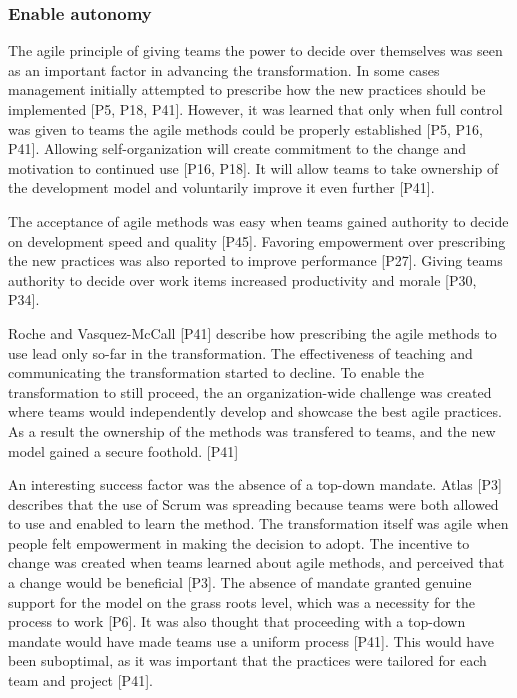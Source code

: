 \documentclass[preprint,authoryear,12pt]{elsarticle}
\begin{document}
\subsubsection{Enable autonomy}


The agile principle of giving teams the power to decide over themselves was seen
as an important factor in advancing the transformation.
In some cases management initially attempted to prescribe how the new practices
should be implemented [P5, P18, P41]. However, it was learned that only when
full control was given to teams the agile methods could be properly established
[P5, P16, P41].
Allowing self-organization will create commitment to the change and motivation
to continued use [P16, P18]. It will allow teams to take ownership of the
development model and voluntarily improve it even further [P41].

The acceptance of agile methods was easy when teams gained authority to decide
on development speed and quality [P45]. Favoring empowerment over prescribing
the new practices was also reported to improve performance [P27]. Giving teams
authority to decide over work items increased productivity and morale [P30,
P34].

Roche and Vasquez-McCall [P41] describe how prescribing the agile methods to use
lead only so-far in the transformation. The effectiveness of teaching and
communicating the transformation started to decline. To enable the
transformation to still proceed, the an organization-wide challenge was created
where teams would independently develop and showcase the best agile practices.
As a result the ownership of the methods was transfered to teams, and the new
model gained a secure foothold. [P41]


An interesting success factor was the absence of a top-down mandate. Atlas [P3]
describes that the use of Scrum was spreading because teams were both allowed to
use and enabled to learn the method. The transformation itself was agile when
people felt empowerment in making the decision to adopt. The incentive to change
was created when teams learned about agile methods, and perceived that a change
would be beneficial [P3].
The absence of mandate granted genuine support for the model on the grass roots
level, which was a necessity for the process to work [P6].
It was also thought that proceeding with a top-down mandate would have made
teams use a uniform process [P41]. This would have been suboptimal, as it was
important that the practices were tailored for each team and project [P41].
\end{document}
